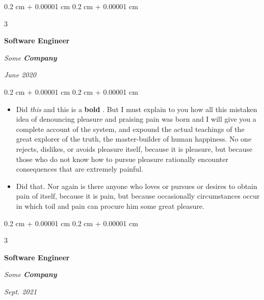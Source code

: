 \documentclass[10pt, letterpaper]{article}
\newenvironment{highlights}{
    \begin{itemize}[
        topsep=0.10 cm,
        parsep=0.10 cm,
        partopsep=0pt,
        itemsep=0pt,
        leftmargin=0.4 cm + 10pt + 0.6 cm
    ]
}{
    \end{itemize}
} %
\newenvironment{onecolentry}{
    \begin{adjustwidth}{
        0.2 cm + 0.00001 cm
    }{
        0.2 cm + 0.00001 cm
    }
}{
    \end{adjustwidth}
} %
\newenvironment{threecolentry}[3][]{
    \onecolentry
    \def\thirdColumn{#3}
    \setcolumnwidth{0.6 cm, \fill, 4.5 cm}
    \begin{paracol}{3}
    #2 \switchcolumn
}{
    \switchcolumn \raggedleft \thirdColumn
    \end{paracol}
    \endonecolentry
} %
\let\hrefWithoutArrow\href
\renewcommand{\href}[2]{\hrefWithoutArrow{#1}{\mbox{\ifthenelse{\equal{#2}{}}{ }{#2 }\raisebox{.15ex}{\footnotesize \faExternalLink*}}}}
\begin{document}
        \vspace{0.2 cm-3px}

        \begin{threecolentry}{
            \vspace*{\fill}
            \textbullet
            \vspace*{3px}
            \vspace*{\fill}
        }{
            
            
        \textit{June 2020}}
            \textbf{Software Engineer}
            
            \textit{Some \textbf{Company}}
        \end{threecolentry}

        \vspace{0.10 cm-3px}
        \begin{onecolentry}
            \begin{highlights}
                \item Did \textit{this} and this is a \textbf{bold} \href{https://example.com}{link}. But I must explain to you how all this mistaken idea of denouncing pleasure and praising pain was born and I will give you a complete account of the system, and expound the actual teachings of the great explorer of the truth, the master-builder of human happiness. No one rejects, dislikes, or avoids pleasure itself, because it is pleasure, but because those who do not know how to pursue pleasure rationally encounter consequences that are extremely painful.
                \item Did that. Nor again is there anyone who loves or pursues or desires to obtain pain of itself, because it is pain, but because occasionally circumstances occur in which toil and pain can procure him some great pleasure.
            \end{highlights}
        \end{onecolentry}


        \vspace{0.2 cm-3px}

        \begin{threecolentry}{
            \vspace*{\fill}
            \textbullet
            \vspace*{3px}
            \vspace*{\fill}
        }{
            
            
        \textit{Sept. 2021}}
            \textbf{Software Engineer}
            
            \textit{Some \textbf{Company}}
        \end{threecolentry}
\end{document}
